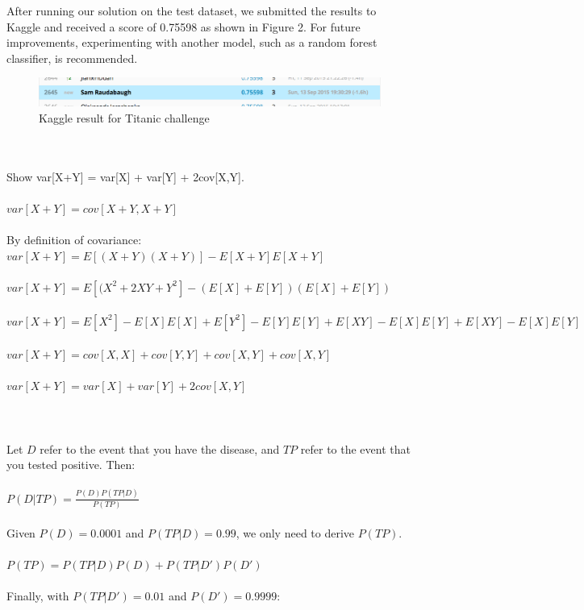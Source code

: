 \documentclass[12pt]{report}
\begin{document}
After running our solution on the test dataset, we submitted the results to Kaggle and received a score of 0.75598 as shown in Figure 2. For future improvements, experimenting with another model,
such as a random forest classifier, is recommended.
\begin{figure}
\centering
  \includegraphics[width=150mm]{figures/kaggle-titanic.png}
\caption{Kaggle result for Titanic challenge}
\end{figure}
\newpage
{}
\\\\
Show var[X+Y] = var[X] + var[Y] + 2cov[X,Y].
\\\\
$var[X+Y] = cov[X+Y, X+Y]$
\\\\
By definition of covariance:
\\
$var[X+Y] = E[(X+Y)(X+Y)] - E[X+Y]E[X+Y]$
\\\\
$var[X+Y] = E[(X^2+2XY+Y^2]-(E[X]+E[Y])(E[X]+E[Y])$
\\\\
$var[X+Y] = E[X^2]-E[X]E[X] + E[Y^2]-E[Y]E[Y] + E[XY]-E[X]E[Y] + E[XY]-E[X]E[Y]$
\\\\
$var[X+Y] = cov[X,X] + cov[Y,Y] + cov[X,Y] + cov[X,Y]$
\\\\
$var[X+Y] = var[X] + var[Y] + 2cov[X,Y]$
\\\\
\\\\
Let $D$ refer to the event that you have the disease, and $TP$ refer to the event that you tested positive. Then:
\\\\
$P(D|TP) = \frac{P(D)P(TP|D)}{P(TP)}$
\\\\
Given $P(D) = 0.0001$ and $P(TP|D) = 0.99$, we only need to derive $P(TP)$.
\\\\
$P(TP) = P(TP|D)P(D)+P(TP|D')P(D')$
\\\\
Finally, with $P(TP|D') = 0.01$ and $P(D') = 0.9999$:
\end{document}
